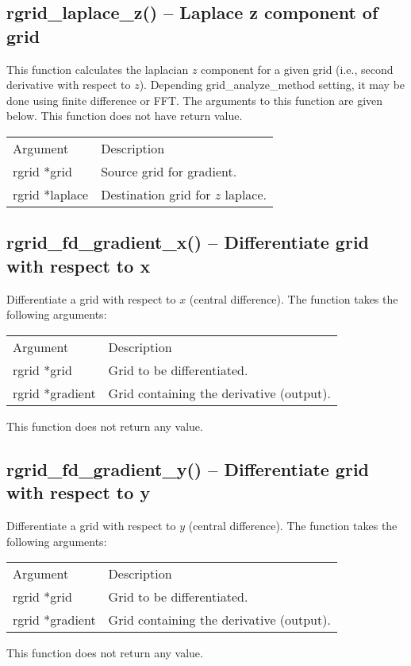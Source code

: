 \documentclass[12pt,letterpaper]{report}
\begin{document}
\subsection{rgrid\_laplace\_z() -- Laplace z component of grid}

This function calculates the laplacian $z$ component for a given grid (i.e., second derivative with respect to $z$). Depending grid\_analyze\_method setting, it may be done using finite difference or FFT. The arguments to this function are given below. This function does not have return value.\\
\begin{longtable}{p{} p{}}
Argument & Description\\
\cline{1-2}
rgrid *grid & Source grid for gradient.\\
rgrid *laplace & Destination grid for $z$ laplace.\\
\end{longtable}

\subsection{rgrid\_fd\_gradient\_x() -- Differentiate grid with respect to x}

Differentiate a grid with respect to $x$ (central difference). The function takes the following arguments:
\begin{longtable}{p{} p{}}
Argument & Description\\
\cline{1-2}
rgrid *grid & Grid to be differentiated.\\
rgrid *gradient & Grid containing the derivative (output).\\
\end{longtable}
\noindent
This function does not return any value.

\subsection{rgrid\_fd\_gradient\_y() -- Differentiate grid with respect to y}

Differentiate a grid with respect to $y$ (central difference). The function takes the following arguments:
\begin{longtable}{p{} p{}}
Argument & Description\\
\cline{1-2}
rgrid *grid & Grid to be differentiated.\\
rgrid *gradient & Grid containing the derivative (output).\\
\end{longtable}
\noindent
This function does not return any value.
\end{document}
